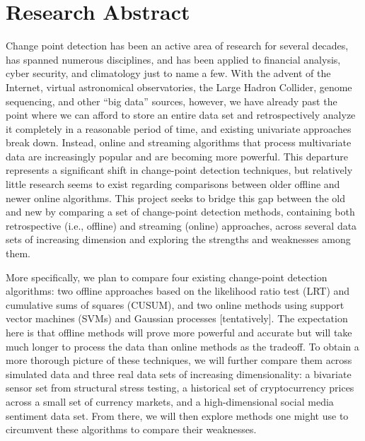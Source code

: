 \documentclass[10pt,letterpaper]{article}
\begin{document}
\maketitle

\section{Research Abstract}

Change point detection has been an active area of research for several decades, has spanned numerous disciplines, and has been applied to financial analysis, cyber security, and climatology just to name a few.
With the advent of the Internet, virtual astronomical observatories, the Large Hadron Collider, genome sequencing, and other ``big data'' sources, however, we have already past the point where we can afford to store an entire data set and retrospectively analyze it completely in a reasonable period of time, and existing univariate approaches break down.
Instead, online and streaming algorithms that process multivariate data are increasingly popular and are becoming more powerful.
This departure represents a significant shift in change-point detection techniques, but relatively little research seems to exist regarding comparisons between older offline and newer online algorithms.
This project seeks to bridge this gap between the old and new by comparing a set of change-point detection methods, containing both retrospective (i.e., offline) and streaming (online) approaches, across several data sets of increasing dimension and exploring the strengths and weaknesses among them.

More specifically, we plan to compare four existing change-point detection algorithms: two offline approaches based on the likelihood ratio test (LRT) and cumulative sums of squares (CUSUM), and two online methods using support vector machines (SVMs) and Gaussian processes [tentatively].
The expectation here is that offline methods will prove more powerful and accurate but will take much longer to process the data than online methods as the tradeoff.
To obtain a more thorough picture of these techniques, we will further compare them across simulated data and three real data sets of increasing dimensionality: a bivariate sensor set from structural stress testing, a historical set of cryptocurrency prices across a small set of currency markets, and a high-dimensional social media sentiment data set.
From there, we will then explore methods one might use to circumvent these algorithms to compare their weaknesses.
\end{document}
